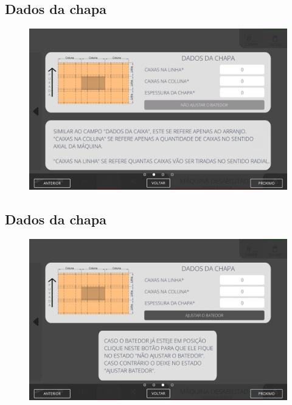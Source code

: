 \newpage
\thispagestyle{fancy}
\vspace*{40 pt}
\subsection{\small Dados da chapa}
\vspace*{\fill}
\begin{figure}[h]
    \centering
    \includegraphics[width=576 px,height=360 px]{src/imagesICV/09-request/new/e-7.png}
\end{figure}
\vspace*{\fill}

\newpage
\thispagestyle{fancy}
\vspace*{40 pt}
\subsection{\small Dados da chapa}
\vspace*{\fill}
\begin{figure}[h]
    \centering
    \includegraphics[width=576 px,height=360 px]{src/imagesICV/09-request/new/e-8-COM-ERRO-DIGITAÇÃO.png}
\end{figure}
\vspace*{\fill}

